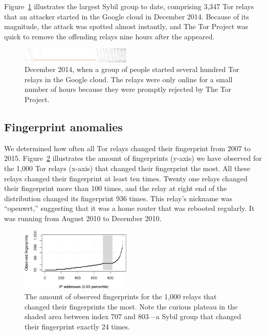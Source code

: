 Figure~\ref{fig:2014-12-lizard} illustrates the largest Sybil group to date,
comprising 3,347 Tor relays that an attacker started in the Google cloud in
December 2014.  Because of its magnitude, the attack was spotted almost
instantly, and The Tor Project was quick to remove the offending relays nine
hours after the appeared.

\begin{figure}[t]
	\centering
	\includegraphics[width=0.47\textwidth]{diagrams/lizard-uptimes.jpg}
	\caption{December 2014, when a group of people started several hundred Tor
	relays in the Google cloud.  The relays were only online for a small number
	of hours because they were promptly rejected by The Tor Project.}
	\label{fig:2014-12-lizard}
\end{figure}

\subsection{Fingerprint anomalies}
\label{sec:fingerprint-anomalies}
We determined how often all Tor relays changed their fingerprint from 2007 to
2015.  Figure~\ref{fig:fingerprints} illustrates the amount of fingerprints
(y-axis) we have observed for the 1,000 Tor relays (x-axis) that changed their
fingerprint the most.  All these relays changed their fingerprint at least ten
times.  Twenty one relays changed their fingerprint more than 100 times, and the
relay at right end of the distribution changed its fingerprint 936 times.  This
relay's nickname was ``openwrt,'' suggesting that it was a home router that was
rebooted regularly.  It was running from August 2010 to December 2010.

\begin{figure}[t]
	\centering
	\includegraphics[width=0.47\textwidth]{diagrams/fingerprints.pdf}
	\caption{The amount of observed fingerprints for the 1,000 relays that
	changed their fingerprints the most.  Note the curious plateau in the shaded
	area between index 707 and 803---a Sybil group that changed their
	fingerprint exactly 24 times.}
	\label{fig:fingerprints}
\end{figure}

